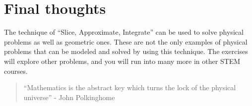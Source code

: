 \documentclass{ximera}
\begin{document}
%        
\section{Final thoughts}
The technique of ``Slice, Approximate, Integrate'' can be used to solve physical problems as well as geometric ones.  These are not the only examples of physical problems that can be modeled and solved by using this technique.  The exercises will explore other problems, and you will run into many more in other STEM courses.

\begin{quote}
``Mathematics is the abstract key which turns the lock of the physical universe'' - John Polkinghome
\end{quote}
\end{document}
